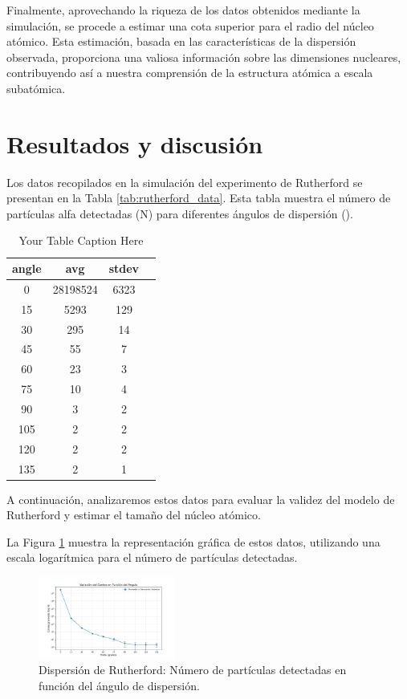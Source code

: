 \documentclass[twocolumn,a4paper,11pt]{scrartcl}
\begin{document}
Finalmente, aprovechando la riqueza de los datos obtenidos mediante la simulación, se procede a estimar una cota superior para el radio del núcleo atómico. Esta estimación, basada en las características de la dispersión observada, proporciona una valiosa información sobre las dimensiones nucleares, contribuyendo así a nuestra comprensión de la estructura atómica a escala subatómica.

\section{Resultados y discusión}

Los datos recopilados en la simulación del experimento de Rutherford se presentan en la Tabla \ref{tab:rutherford_data}. Esta tabla muestra el número de partículas alfa detectadas (N) para diferentes ángulos de dispersión (\theta).

\begin{table}[h!]
  \centering
  \begin{tabular}{cccc}
  \hline
  angle & avg & stdev \\
  \hline
  0 & 28198524 & 6323 \\
  15 & 5293 & 129 \\
  30 & 295 & 14 \\
  45 & 55 & 7 \\
  60 & 23 & 3 \\
  75 & 10 & 4 \\
  90 & 3 & 2 \\
  105 & 2 & 2 \\
  120 & 2 & 2 \\
  135 & 2 & 1 \\
  \hline
  \end{tabular}
  \caption{Your Table Caption Here}
  \label{tab:your_table}
  \end{table}


A continuación, analizaremos estos datos para evaluar la validez del modelo de Rutherford y estimar el tamaño del núcleo atómico.

La Figura \ref{fig:rutherford_dispersion} muestra la representación gráfica de estos datos, utilizando una escala logarítmica para el número de partículas detectadas.

\begin{figure}[h]
\centering
\includegraphics[width=0.4\textwidth]{data.png}
\caption{Dispersión de Rutherford: Número de partículas detectadas en función del ángulo de dispersión.}
\label{fig:rutherford_dispersion}
\end{figure}
\end{document}
